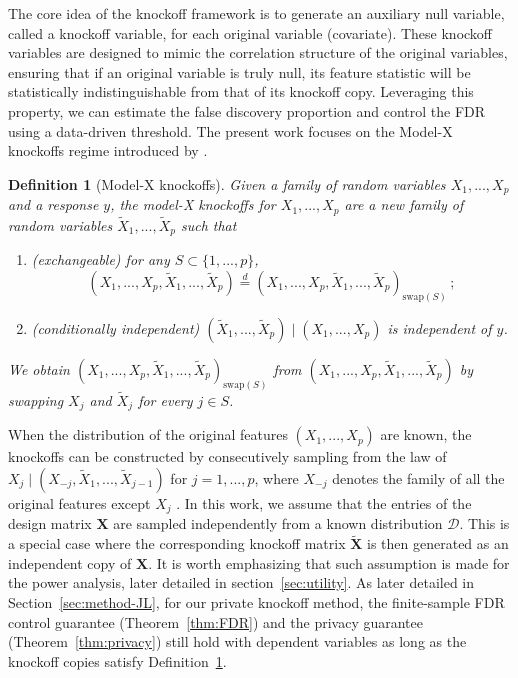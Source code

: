 \documentclass[11pt]{article}
\newtheorem{definition}{Definition}%
\newcommand{\bX}{\boldsymbol{X}}
\newcommand{\bXT}{\widetilde{\bX} }
\begin{document}
The core idea of the knockoff framework is to generate an auxiliary null variable, called a knockoff variable, for each original variable (covariate). These knockoff variables are designed to mimic the correlation structure of the original variables, ensuring that if an original variable is truly null, its feature statistic will be statistically indistinguishable from that of its knockoff copy. Leveraging this property, we can estimate the false discovery proportion and control the FDR using a data-driven threshold. The present work focuses on the Model-X knockoffs regime introduced by \cite{candes2017panning}. 
\begin{definition}[Model-X knockoffs]\label{def:knockoffs}
     Given a family of random variables $X_1,...,X_p$ and a response $y$, the model-X knockoffs for $X_1,...,X_p$ are a new family of random variables $\widetilde{X}_1,...,\widetilde{X}_p$ such that 
    \begin{enumerate}
        \item (exchangeable) for any $S\subset\{1,...,p\}$, 
        \[
        (X_1,...,X_p,\widetilde{X}_1,...,\widetilde{X}_p) \stackrel{d}{=}(X_1,...,X_p,\widetilde{X}_1,...,\widetilde{X}_p)_{\mbox{swap}(S)}\,;
        \]
        \item (conditionally independent) $(\widetilde{X}_1,...,\widetilde{X}_p)\mid(X_1,...,X_p)$ is independent of $y$.
    \end{enumerate}
    We obtain $(X_1,...,X_p,\widetilde{X}_1,...,\widetilde{X}_p)_{\mbox{swap}(S)}$ from $(X_1,...,X_p,\widetilde{X}_1,...,\widetilde{X}_p)$ by swapping $X_j$ and $\widetilde{X}_j$ for every $j\in S$.
\end{definition}
When the distribution of the original features $(X_1,...,X_p)$ are known, the knockoffs can be constructed by consecutively sampling from the law of $X_j\mid(X_{-j},\widetilde{X}_1,...,\widetilde{X}_{j-1})$ for $j =1,...,p$, where $X_{-j}$ denotes the family of all the original features except $X_j$ \citep{candes2017panning}. In this work, we assume that the entries of the design matrix $\bX$ are sampled independently from a known distribution $\mathcal{D}$. This is a special case where the corresponding knockoff matrix $\bXT$ is then generated as an independent copy of $\bX$. It is worth emphasizing that such assumption is made for the power analysis, later detailed in section~\ref{sec:utility}. As later detailed in Section~\ref{sec:method-JL}, for our private knockoff method, the finite-sample FDR control guarantee (Theorem~\ref{thm:FDR}) and the privacy guarantee (Theorem~\ref{thm:privacy}) still hold with dependent variables as long as the knockoff copies satisfy Definition~\ref{def:knockoffs}.
\end{document}
